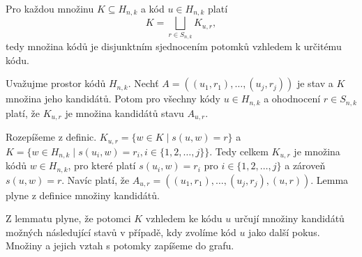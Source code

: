 \begin{lemma}\label{lemmadisjunktnipotomci}
    Pro každou množinu $K \subseteq H_{n,k}$ a kód $u \in H_{n,k}$ platí
    \[K = \bigsqcup_{r\in S_{n,k}} K_{u,r},\]
    tedy množina kódů je disjunktním sjednocením potomků vzhledem k určitému kódu.
\end{lemma}



\begin{lemma}\label{lemmavztahnaslednikuapotomku}
    Uvažujme prostor kódů $H_{n,k}$. Nechť $A = \left((u_1, r_1), \dots, (u_j,r_j)\right)$ je stav a $K$ množina jeho kandidátů. Potom pro všechny kódy $u\in H_{n,k}$ a ohodnocení $r \in S_{n,k}$ platí, že $K_{u,r}$ je množina kandidátů stavu $A_{u,r}$.
\end{lemma}
\begin{dukaz}
    Rozepíšeme z definic. 
    $K_{u,r} = \{w \in K \mid s(u,w) = r\}$ a $K = \{w \in H_{n,k} \mid s(u_i,w) = r_i,  i \in \{1,2,\dots ,j\} \}$. Tedy celkem 
    $K_{u,r}$ je množina kódů $w \in H_{n,k}$, pro které platí $s(u_i,w) = r_i$ pro $i \in \{1,2,\dots ,j\}$ a zároveň $s(u,w) = r$.
    Navíc platí, že $A_{u,r} = \left((u_1, r_1), \dots, (u_j,r_j), (u,r)\right)$. Lemma plyne z definice množiny kandidátů.
\end{dukaz}
Z lemmatu plyne, že potomci $K$ vzhledem ke kódu $u$ určují množiny kandidátů možných následující stavů v případě, kdy zvolíme kód $u$ jako další pokus. Množiny a jejich vztah s potomky zapíšeme do grafu. 

